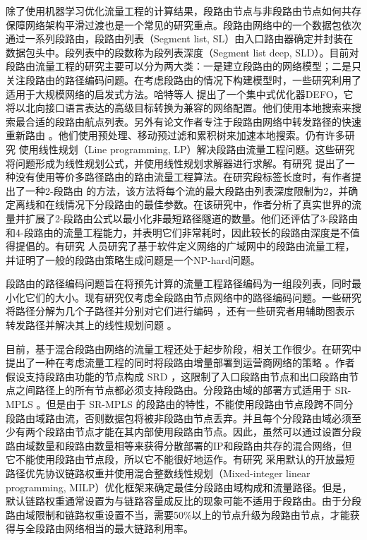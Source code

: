 除了使用机器学习优化流量工程的计算结果，段路由节点与非段路由节点如何共存保障网络架构平滑过渡也是一个常见的研究重点。段路由网络中的一个数据包依次通过一系列段路由，段路由列表（Segment list, SL）由入口路由器确定并封装在数据包头中。段列表中的段数称为段列表深度（Segment list deep, SLD）。目前对段路由流量工程的研究主要可以分为两大类：一是建立段路由的网络模型；二是只关注段路由的路径编码问题。在考虑段路由的情况下构建模型时，一些研究利用了适用于大规模网络的启发式方法。哈特等人 \cite{DEFO} 提出了一个集中式优化器DEFO，它将以北向接口语言表达的高级目标转换为兼容的网络配置。他们使用本地搜索来搜索最合适的段路由航点列表。另外有论文作者专注于段路由网络中转发路径的快速重新路由 \cite{SRFRR1, SRFRR2} 。他们使用预处理、移动预过滤和累积树来加速本地搜索。仍有许多研究 \cite{SRBANDWIDTH8} 使用线性规划（Line programming, LP）解决段路由流量工程问题。这些研究将问题形成为线性规划公式，并使用线性规划求解器进行求解。有研究 \cite{SRBANDWIDTH7} 提出了一种没有使用等价多路径路由的路由流量工程算法。在研究段标签长度时，有作者提出了一种2-段路由 \cite{2SR} 的方法，该方法将每个流的最大段路由列表深度限制为2，并确定离线和在线情况下分段路由的最佳参数。在该研究中，作者分析了真实世界的流量并扩展了2-段路由公式以最小化非最短路径隧道的数量。他们还评估了3-段路由和4-段路由的流量工程能力，并表明它们非常耗时，因此较长的段路由深度是不值得提倡的。有研究 \cite{SRBANDWIDTH10} 人员研究了基于软件定义网络的广域网中的段路由流量工程，并证明了一般的段路由策略生成问题是一个NP-hard问题。

段路由的路径编码问题旨在将预先计算的流量工程路径编码为一组段列表，同时最小化它们的大小。现有研究仅考虑全段路由节点网络中的路径编码问题。一些研究将路径分解为几个子路径并分别对它们进行编码 \cite{SRXXXX1, SRXXXX2, SRXXXX3} ，还有一些研究者用辅助图表示转发路径并解决其上的线性规划问题 \cite{SRXXXX4, SRXXXX5} 。

目前，基于混合段路由网络的流量工程还处于起步阶段，相关工作很少。在研究中提出了一种在考虑流量工程的同时将段路由增量部署到运营商网络的策略 \cite{SRXXXX6} 。作者假设支持段路由功能的节点构成 \gls*{SRD} ，这限制了入口段路由节点和出口段路由节点之间路径上的所有节点都必须支持段路由。分段路由域的部署方式适用于 \gls*{SR-MPLS} 。但是由于 \gls*{SR-MPLS} 的段路由的特性，不能使用段路由节点段跨不同分段路由域路由流，否则数据包将被非段路由节点丢弃。并且每个分段路由域必须至少有两个段路由节点才能在其内部使用段路由节点。因此，虽然可以通过设置分段路由域数量和段路由数量相等来获得分散部署的IP和段路由共存的混合网络，但它不能使用段路由节点段，所以它不能很好地运作。有研究 \cite{SRXXXX7} 采用默认的开放最短路径优先协议链路权重并使用混合整数线性规划（Mixed-integer linear programming, MILP）优化框架来确定最佳分段路由域构成和流量路径。但是，默认链路权重通常设置为与链路容量成反比的现象可能不适用于段路由。由于分段路由域限制和链路权重设置不当，需要50\%以上的节点升级为段路由节点，才能获得与全段路由网络相当的最大链路利用率。

